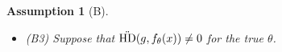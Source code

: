 \documentclass[11 pt]{article}
\newtheorem*{ass*}{Assumption}
\newtheorem{rem}{Remark}
\renewcommand{\th}{\theta}
\newcommand{\xra}[1]{\mathop{ \xrightarrow{#1} }}
\newcommand{\hell}{\text{HD}}
\newcommand{\ddhell}{\ddot{\hell}}
\begin{document}
\begin{ass*}[B]
\begin{itemize}
  \item{(B3)} Suppose that $\ddhell(g,\fth) \neq 0$ for the true $\th$. 
\end{itemize}
\end{ass*}

\end{document}
